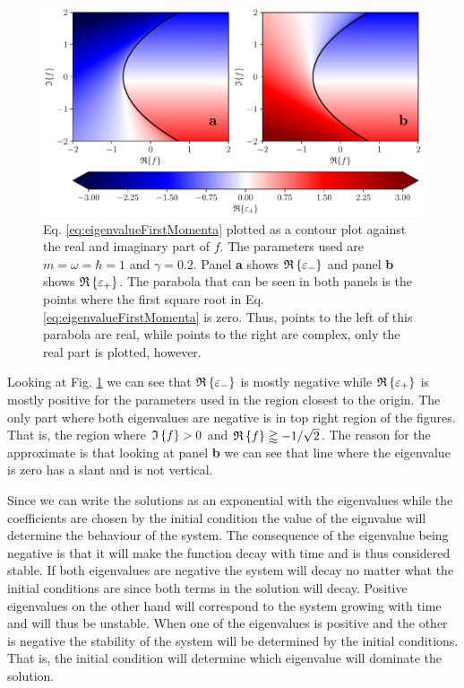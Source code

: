 \begin{figure}
    \centering
    \includegraphics[width=\textwidth]{figures/eigenvalueFirstMomenta.pdf}
    \caption{\small Eq. \eqref{eq:eigenvalueFirstMomenta} plotted as a contour plot against the real and imaginary part of $f$. The parameters used are $m = \omega = \hbar =1$ and $\gamma = 0.2$. Panel \textbf{a} shows $\mathfrak{R}\left\{\varepsilon_-\right\}$ and panel \textbf{b} shows $\mathfrak{R}\left\{\varepsilon_+\right\}$. The parabola that can be seen in both panels is the points where the first square root in Eq. \eqref{eq:eigenvalueFirstMomenta} is zero. Thus, points to the left of this parabola are real, while points to the right are complex, only the real part is plotted, however.}
    \label{fig:eigenvalueFirstMomenta}
\end{figure}

Looking at Fig. \ref{fig:eigenvalueFirstMomenta} we can see that $\mathfrak{R}\left\{\varepsilon_-\right\}$ is mostly negative while $\mathfrak{R}\left\{\varepsilon_+\right\}$ is mostly positive for the parameters used in the region closest to the origin. The only part where both eigenvalues are negative is in top right region of the figures. That is, the region where $\mathfrak{I}\left\{f\right\} > 0$ and $\mathfrak{R}\left\{f\right\} \gtrapprox -1 / \sqrt{2}$. The reason for the approximate is that looking at panel \textbf{b} we can see that line where the eigenvalue is zero has a slant and is not vertical.

Since we can write the solutions as an exponential with the eigenvalues while the coefficients are chosen by the initial condition the value of the eignvalue will determine the behaviour of the system. The consequence of the eigenvalue being negative is that it will make the function decay with time and is thus considered stable. If both eigenvalues are negative the system will decay no matter what the initial conditions are since both terms in the solution will decay. Positive eigenvalues on the other hand will correspond to the system growing with time and will thus be unstable. When one of the eigenvalues is positive and the other is negative the stability of the system will be determined by the initial conditions. That is, the initial condition will determine which eigenvalue will dominate the solution.

